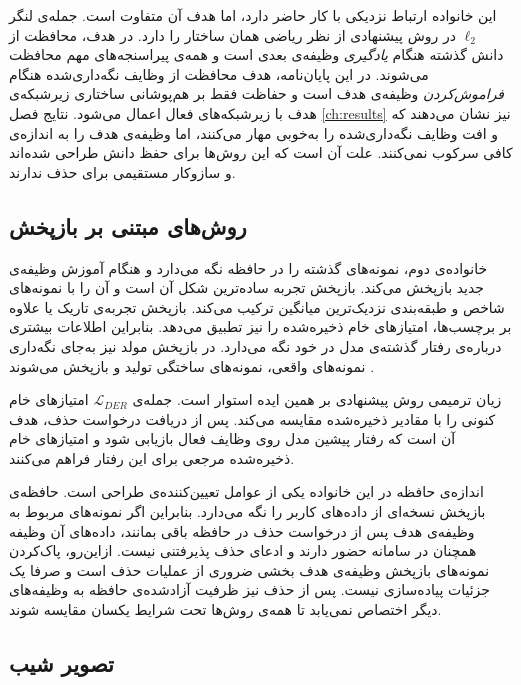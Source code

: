 این خانواده ارتباط نزدیکی با کار حاضر دارد، اما هدف آن متفاوت است. جمله‌ی لنگر $\ell_2$ در روش پیشنهادی از نظر ریاضی همان ساختار  را دارد. در  هدف، محافظت از دانش گذشته هنگام \emph{یادگیری} وظیفه‌ی بعدی است و همه‌ی پیراسنجه‌های مهم محافظت می‌شوند. در این پایان‌نامه، هدف محافظت از وظایف نگه‌داری‌شده هنگام \emph{فراموش‌کردن} وظیفه‌ی هدف است و حفاظت فقط بر هم‌پوشانی ساختاری زیرشبکه‌ی هدف با زیرشبکه‌های فعال اعمال می‌شود. نتایج فصل \ref{ch:results} نیز نشان می‌دهند که  و  افت وظایف نگه‌داری‌شده را به‌خوبی مهار می‌کنند، اما وظیفه‌ی هدف را به اندازه‌ی کافی سرکوب نمی‌کنند. علت آن است که این روش‌ها برای حفظ دانش طراحی شده‌اند و سازوکار مستقیمی برای حذف ندارند.

\subsection{روش‌های مبتنی بر بازپخش}
\label{subsec:lit-replay}

خانواده‌ی دوم، نمونه‌های گذشته را در حافظه نگه می‌دارد و هنگام آموزش وظیفه‌ی جدید بازپخش می‌کند. {بازپخش تجربه} ساده‌ترین شکل آن است و  \cite{rebuffi2017icarl} آن را با نمونه‌های شاخص و طبقه‌بندی نزدیک‌ترین میانگین ترکیب می‌کند. {بازپخش تجربه‌ی تاریک} یا  \cite{buzzega2020dark} علاوه بر برچسب‌ها، امتیازهای خام ذخیره‌شده را نیز تطبیق می‌دهد. بنابراین اطلاعات بیشتری درباره‌ی رفتار گذشته‌ی مدل در خود نگه می‌دارد. در {بازپخش مولد} نیز به‌جای نگه‌داری نمونه‌های واقعی، نمونه‌های ساختگی تولید و بازپخش می‌شوند \cite{shin2017deepgenerative}.

زیان ترمیمی روش پیشنهادی بر همین ایده استوار است. جمله‌ی $\mathcal{L}_{DER}$ امتیازهای خام کنونی را با مقادیر ذخیره‌شده مقایسه می‌کند. پس از دریافت درخواست حذف، هدف آن است که رفتار پیشین مدل روی وظایف فعال بازیابی شود و امتیازهای خام ذخیره‌شده مرجعی برای این رفتار فراهم می‌کنند.



اندازه‌ی حافظه در این خانواده یکی از عوامل تعیین‌کننده‌ی طراحی است. حافظه‌ی بازپخش نسخه‌ای از داده‌های کاربر را نگه می‌دارد. بنابراین اگر نمونه‌های مربوط به وظیفه‌ی هدف پس از درخواست حذف در حافظه باقی بمانند، داده‌های آن وظیفه همچنان در سامانه حضور دارند و ادعای حذف پذیرفتنی نیست. ازاین‌رو، پاک‌کردن نمونه‌های بازپخش وظیفه‌ی هدف بخشی ضروری از عملیات حذف است و صرفا یک جزئیات پیاده‌سازی نیست. پس از حذف نیز ظرفیت آزادشده‌ی حافظه به وظیفه‌های دیگر اختصاص نمی‌یابد تا همه‌ی روش‌ها تحت شرایط یکسان مقایسه شوند.

\subsection{تصویر شیب}
\label{subsec:lit-projection}

